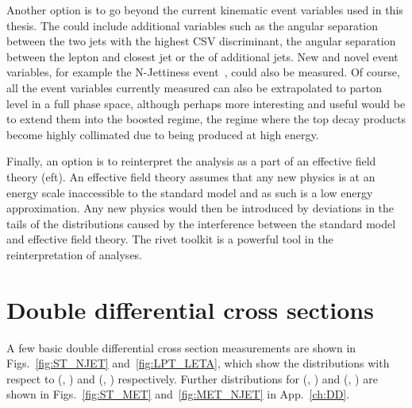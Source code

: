 Another option is to go beyond the current kinematic event variables used in this thesis.
The could include additional variables such as the angular separation between the two \bquark{} jets with the highest CSV discriminant, the angular separation between the lepton and closest \bquark{} jet or the \pt{} of additional jets. %
New and novel event variables, for example the N-Jettiness event~\cite{Future:NJettiness}, could also be measured. 
Of course, all the event variables currently measured can also be extrapolated to parton level in a full phase space, although perhaps more interesting and useful would be to extend them into the boosted regime, \ie{} the regime where the top decay products become highly collimated due to being produced at high energy.

Finally, an option is to reinterpret the analysis as a part of an effective field theory (\acrshort{eft}).
An effective field theory assumes that any new physics is at an energy scale inaccessible to the standard model and as such is a low energy approximation.
Any new physics would then be introduced by deviations in the tails of the distributions caused by the interference between the standard model and effective field theory.
The \acrshort{rivet} toolkit is a powerful tool in the reinterpretation of analyses.

\section{Double differential cross sections} %
\label{sec:double_differential_cross_sections}

A few basic double differential cross section measurements are shown in Figs.~\ref{fig:ST_NJET} and~\ref{fig:LPT_LETA}, which show the distributions with respect to (\ST{}, \NJET{}) and (\LPT{}, \LETA{}) respectively.
Further distributions for (\ST{}, \ptmiss{}) and (\ptmiss{}, \NJET{}) are shown in Figs.~\ref{fig:ST_MET} and~\ref{fig:MET_NJET} in App.~\ref{ch:DD}.

